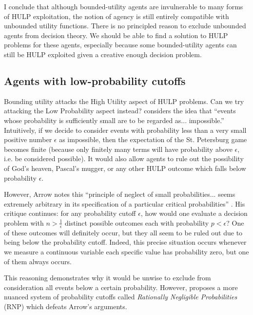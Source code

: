 \documentclass{article}
\begin{document}
I conclude that although bounded-utility agents are invulnerable to many forms of HULP exploitation, the notion of agency is still entirely compatible with unbounded utility functions. There is no principled reason to exclude unbounded agents from decision theory. We should be able to find a solution to HULP problems for these agents, especially because some bounded-utility agents can still be HULP exploited given a creative enough decision problem.

\subsection{Agents with low-probability cutoffs}

Bounding utility attacks the High Utility aspect of HULP problems. Can we try attacking the Low Probability aspect instead? \citet[pg. 414]{arrow1951alternative} considers the idea that ``events whose probability is sufficiently small are to be regarded as... impossible.'' Intuitively, if we decide to consider events with probability less than a very small positive number \(\epsilon\) as impossible, then the expectation of the St. Petersburg game becomes finite (because only finitely many terms will have probability above \(\epsilon\), i.e. be considered possible). It would also allow agents to rule out the possibility of God's heaven, Pascal's mugger, or any other HULP outcome which falls below probability \(\epsilon\).

However, Arrow notes this ``principle of neglect of small probabilities... seems extremely arbitrary in its specification of a particular critical probabilities'' \citep[pg. 414]{arrow1951alternative}. His critique continues: for any probability cutoff \(\epsilon\), how would one evaluate a decision problem with \(n > \frac{1}{\epsilon}\) distinct possible outcomes each with probability \(p < \epsilon\)? One of these outcomes will definitely occur, but they all seem to be ruled out due to being below the probability cutoff. Indeed, this precise situation occurs whenever we measure a continuous variable \textemdash{} each specific value has probability zero, but one of them always occurs.

This reasoning demonstrates why it would be unwise to exclude from consideration all events below a certain probability. However, \citet{smith2014evaluative} proposes a more nuanced system of probability cutoffs called \textit{Rationally Negligible Probabilities} (RNP) which defeats Arrow's arguments.
\end{document}
